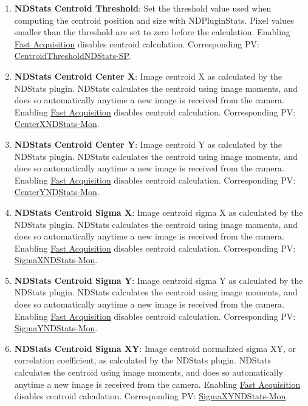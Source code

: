 \documentclass[openany]{article}
\begin{document}
        \begin{enumerate}
            \item \textbf{NDStats Centroid Threshold}: Set the threshold value used when computing the centroid position and size with NDPluginStats. Pixel values smaller than the threshold are set to zero before the calculation. Enabling \hyperref[seq:fast-acq]{Fast Acquisition} disables centroid calculation. Corresponding PV: \hyperlink{pv:centroid-threshold-ndstats}{CentroidThresholdNDStats-SP}.
            \item \textbf{NDStats Centroid Center X}: Image centroid X as calculated by the NDStats plugin. NDStats calculates the centroid using image moments, and does so automatically anytime a new image is received from the camera. Enabling \hyperref[seq:fast-acq]{Fast Acquisition} disables centroid calculation. Corresponding PV: \hyperlink{pv:center-x-ndstats}{CenterXNDStats-Mon}.
            \item \textbf{NDStats Centroid Center Y}: Image centroid Y as calculated by the NDStats plugin. NDStats calculates the centroid using image moments, and does so automatically anytime a new image is received from the camera. Enabling \hyperref[seq:fast-acq]{Fast Acquisition} disables centroid calculation. Corresponding PV: \hyperlink{pv:center-y-ndstats}{CenterYNDStats-Mon}.
            \item \textbf{NDStats Centroid Sigma X}: Image centroid sigma X as calculated by the NDStats plugin. NDStats calculates the centroid using image moments, and does so automatically anytime a new image is received from the camera. Enabling \hyperref[seq:fast-acq]{Fast Acquisition} disables centroid calculation. Corresponding PV: \hyperlink{pv:sigma-x-ndstats}{SigmaXNDStats-Mon}.
            \item \textbf{NDStats Centroid Sigma Y}: Image centroid sigma Y as calculated by the NDStats plugin. NDStats calculates the centroid using image moments, and does so automatically anytime a new image is received from the camera. Enabling \hyperref[seq:fast-acq]{Fast Acquisition} disables centroid calculation. Corresponding PV: \hyperlink{pv:sigma-y-ndstats}{SigmaYNDStats-Mon}.
            \item \textbf{NDStats Centroid Sigma XY}: Image centroid normalized sigma XY, or correlation coefficient, as calculated by the NDStats plugin. NDStats calculates the centroid using image moments, and does so automatically anytime a new image is received from the camera. Enabling \hyperref[seq:fast-acq]{Fast Acquisition} disables centroid calculation. Corresponding PV: \hyperlink{pv:sigma-x-ndstats}{SigmaXYNDStats-Mon}.

\end{enumerate}
\end{document}

